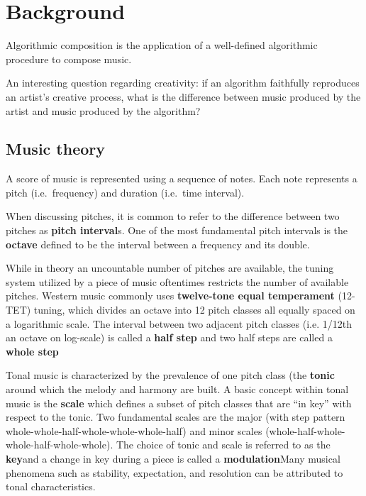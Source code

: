 \chapter{Background}



Algorithmic composition is the application of a well-defined algorithmic
procedure to compose music.

An interesting question regarding creativity: if an algorithm faithfully reproduces
an artist's creative process, what is the difference between music produced by the artist
and music produced by the algorithm?

\section{Music theory}

A score of music is represented using a sequence of notes. Each note represents
a pitch (i.e.\ frequency) and duration (i.e.\ time interval).

When discussing pitches, it is common to refer to the difference between two
pitches as \textbf{pitch interval}s. One of the most fundamental pitch intervals is the
\textbf{octave} defined to be the interval between a frequency and its double.

While in theory an uncountable number of pitches are available, the tuning
system utilized by a piece of music oftentimes restricts the number of
available pitches. Western music commonly uses \textbf{twelve-tone equal
temperament} (12-TET) tuning, which divides an octave into 12 pitch classes
all equally spaced on a logarithmic scale. The interval between two adjacent
pitch classes (i.e. 1/12th an octave on log-scale) is called a \textbf{half step}
and two half steps are called a \textbf{whole step}

Tonal music is characterized by the prevalence of one pitch class (the
\textbf{tonic} around which the melody and harmony are built. A basic concept
within tonal music is the \textbf{scale} which defines a subset of pitch classes
that are ``in key'' with respect to the tonic. Two fundamental scales are the
major (with step pattern whole-whole-half-whole-whole-whole-half) and minor
scales (whole-half-whole-whole-half-whole-whole). The choice of tonic and scale
is referred to as the \textbf{key}and a change in key during a piece is called a
\textbf{modulation}Many musical phenomena such as stability, expectation, and
resolution can be attributed to tonal characteristics.

